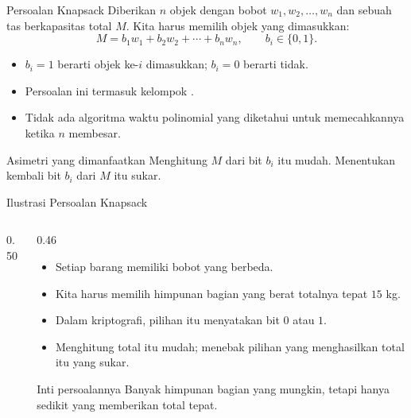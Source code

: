 \documentclass[aspectratio=169,11pt]{beamer}
\begin{document}
\begin{frame}{Persoalan Knapsack}
    Diberikan $n$ objek dengan bobot $w_1, w_2, \dots, w_n$ dan sebuah tas
    berkapasitas total $M$. Kita harus memilih objek yang dimasukkan:
    \[
        M = b_1w_1 + b_2w_2 + \cdots + b_nw_n,
        \qquad b_i \in \{0,1\}.
    \]
    \begin{itemize}
        \item $b_i = 1$ berarti objek ke-$i$ dimasukkan; $b_i = 0$ berarti
              tidak.
        \item Persoalan ini termasuk kelompok .
        \item Tidak ada algoritma waktu polinomial yang diketahui untuk
              memecahkannya ketika $n$ membesar.
    \end{itemize}
    \vspace{0.15cm}
    \begin{exampleblock}{Asimetri yang dimanfaatkan}
        \footnotesize
        Menghitung $M$ dari bit $b_i$ itu mudah. Menentukan kembali bit $b_i$
        dari $M$ itu sukar.
    \end{exampleblock}
\end{frame}

\begin{frame}{Ilustrasi Persoalan Knapsack}
    \begin{columns}[T,onlytextwidth]
        \begin{column}{0.50\textwidth}
            \centering
        \end{column}
        \begin{column}{0.46\textwidth}
            \footnotesize
            \begin{itemize}
                \item Setiap barang memiliki bobot yang berbeda.
                \item Kita harus memilih himpunan bagian yang berat totalnya
                      tepat $15$ kg.
                \item Dalam kriptografi, pilihan itu menyatakan bit $0$ atau
                      $1$.
                \item Menghitung total itu mudah; menebak pilihan yang
                      menghasilkan total itu yang sukar.
            \end{itemize}
            \begin{exampleblock}{Inti persoalannya}
                \footnotesize
                Banyak himpunan bagian yang mungkin, tetapi hanya sedikit yang
                memberikan total tepat.
            \end{exampleblock}
        \end{column}
    \end{columns}
\end{frame}
\end{document}
